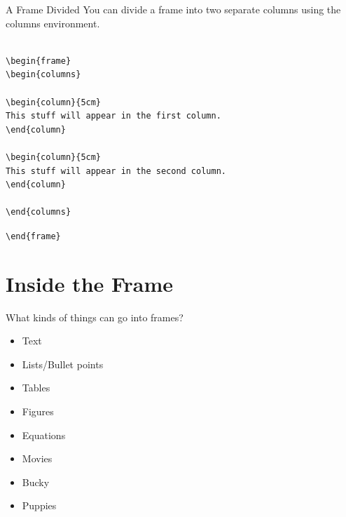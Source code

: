 \documentclass[mathserif, xcolor=svgnames]{beamer}
\begin{document}
\begin{frame}[fragile]{A Frame Divided}
You can divide a frame into two separate columns using the columns environment.

\begin{scriptsize}
\begin{verbatim}

\begin{frame}
\begin{columns}

\begin{column}{5cm}
This stuff will appear in the first column.
\end{column}

\begin{column}{5cm}
This stuff will appear in the second column.
\end{column}

\end{columns}
\end{verbatim}

\verb+\end{frame} +
\end{scriptsize}

\end{frame}


\section{Inside the Frame}
\begin{frame}[label=list]{What kinds of things can go into frames?}
\begin{itemize}
\item<1-> Text
\item<2-> Lists/Bullet points
\item<3-> Tables
\item<4-> Figures
\item<5 -> Equations
\item<6-> Movies
\item<7-> Bucky
\item<8-> Puppies
\end{itemize}
\vspace{1in}

\hyperlink{hyper}{}
\end{frame}
\end{document}
